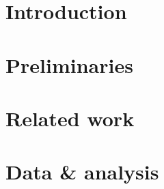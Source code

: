 \documentclass[a4paper]{article}
\numberwithin{algorithm}{section}
\numberwithin{figure}{section}
\numberwithin{table}{section}
\numberwithin{equation}{section}
\begin{document}
    \pagebreak


    \tableofcontents

    \pagebreak

    \pagestyle{plain}
    \setcounter{page}{1}
    \setlength{\parindent}{40pt}

    \section{Introduction}
    \label{sec:intro}
    \pagebreak
   
    \section{Preliminaries}
    \label{sec:prel}
    \pagebreak
    
    \section{Related work}
    \label{sec:relwrk}
    \pagebreak
    
    \section{Data \& analysis}
    \label{sec:data}
    \pagebreak
    
\end{document}
